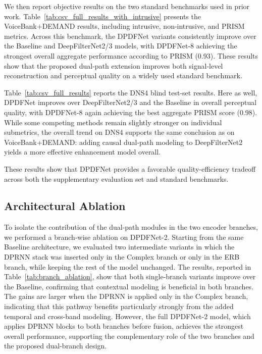 \documentclass[final,5p,times,authoryear]{elsarticle}
\begin{document}
We then report objective results on the two standard benchmarks used in prior work. Table~\ref{tab:csv_full_results_with_intrusive} presents the VoiceBank+DEMAND results, including intrusive, non-intrusive, and PRISM metrics. Across this benchmark, the DPDFNet variants consistently improve over the Baseline and DeepFilterNet2/3 models, with DPDFNet-8 achieving the strongest overall aggregate performance according to PRISM (0.93). These results show that the proposed dual-path extension improves both signal-level reconstruction and perceptual quality on a widely used standard benchmark.

Table~\ref{tab:csv_full_results} reports the DNS4 blind test-set results. Here as well, DPDFNet improves over DeepFilterNet2/3 and the Baseline in overall perceptual quality, with DPDFNet-8 again achieving the best aggregate PRISM score (0.98). While some competing methods remain slightly stronger on individual submetrics, the overall trend on DNS4 supports the same conclusion as on VoiceBank+DEMAND: adding causal dual-path modeling to DeepFilterNet2 yields a more effective enhancement model overall.

These results show that DPDFNet provides a favorable quality-efficiency tradeoff across both the supplementary evaluation set and standard benchmarks.

\subsection{Architectural Ablation}
To isolate the contribution of the dual-path modules in the two encoder branches, we performed a branch-wise ablation on DPDFNet-2. Starting from the same Baseline architecture, we evaluated two intermediate variants in which the DPRNN stack was inserted only in the Complex branch or only in the ERB branch, while keeping the rest of the model unchanged. The results, reported in Table~\ref{tab:branch_ablation}, show that both single-branch variants improve over the Baseline, confirming that contextual modeling is beneficial in both branches. The gains are larger when the DPRNN is applied only in the Complex branch, indicating that this pathway benefits particularly strongly from the added temporal and cross-band modeling. However, the full DPDFNet-2 model, which applies DPRNN blocks to both branches before fusion, achieves the strongest overall performance, supporting the complementary role of the two branches and the proposed dual-branch design.
\end{document}
